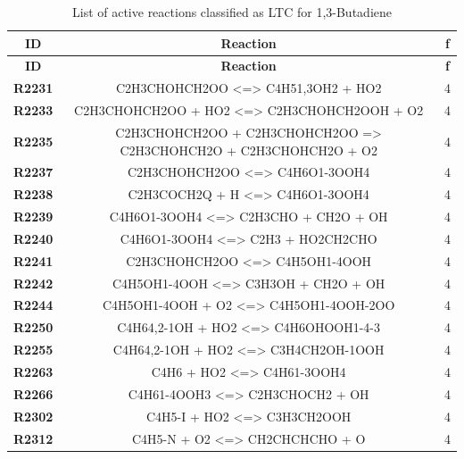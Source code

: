 \begin{longtable}{ccc}
\caption{List of active reactions classified as LTC for 1,3-Butadiene}\\
\hline
\textbf{ID} & \textbf{Reaction} & \textbf{f} \\
\hline
\endfirsthead
\hline
\textbf{ID} & \textbf{Reaction} & \textbf{f} \\
\hline
\endhead
\textbf{R2231} & C2H3CHOHCH2OO \textless{}=\textgreater{} C4H51,3OH2 + HO2 & 4 \\
\textbf{R2233} & C2H3CHOHCH2OO + HO2 \textless{}=\textgreater{} C2H3CHOHCH2OOH + O2 & 4 \\
\textbf{R2235} & C2H3CHOHCH2OO + C2H3CHOHCH2OO =\textgreater{} C2H3CHOHCH2O + C2H3CHOHCH2O + O2 & 4 \\
\textbf{R2237} & C2H3CHOHCH2OO \textless{}=\textgreater{} C4H6O1-3OOH4 & 4 \\
\textbf{R2238} & C2H3COCH2Q + H \textless{}=\textgreater{} C4H6O1-3OOH4 & 4 \\
\textbf{R2239} & C4H6O1-3OOH4 \textless{}=\textgreater{} C2H3CHO + CH2O + OH & 4 \\
\textbf{R2240} & C4H6O1-3OOH4 \textless{}=\textgreater{} C2H3 + HO2CH2CHO & 4 \\
\textbf{R2241} & C2H3CHOHCH2OO \textless{}=\textgreater{} C4H5OH1-4OOH & 4 \\
\textbf{R2242} & C4H5OH1-4OOH \textless{}=\textgreater{} C3H3OH + CH2O + OH & 4 \\
\textbf{R2244} & C4H5OH1-4OOH + O2 \textless{}=\textgreater{} C4H5OH1-4OOH-2OO & 4 \\
\textbf{R2250} & C4H64,2-1OH + HO2 \textless{}=\textgreater{} C4H6OHOOH1-4-3 & 4 \\
\textbf{R2255} & C4H64,2-1OH + HO2 \textless{}=\textgreater{} C3H4CH2OH-1OOH & 4 \\
\textbf{R2263} & C4H6 + HO2 \textless{}=\textgreater{} C4H61-3OOH4 & 4 \\
\textbf{R2266} & C4H61-4OOH3 \textless{}=\textgreater{} C2H3CHOCH2 + OH & 4 \\
\textbf{R2302} & C4H5-I + HO2 \textless{}=\textgreater{} C3H3CH2OOH & 4 \\
\textbf{R2312} & C4H5-N + O2 \textless{}=\textgreater{} CH2CHCHCHO + O & 4 \\
\hline
\end{longtable}